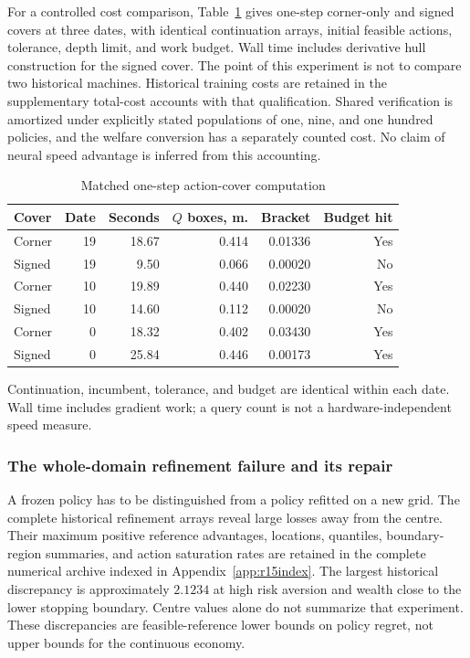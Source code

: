 For a controlled cost comparison, Table~\ref{tab:r9matched} gives one-step corner-only and signed covers at three dates, with identical continuation arrays, initial feasible actions, tolerance, depth limit, and work budget. Wall time includes derivative hull construction for the signed cover. The point of this experiment is not to compare two historical machines. Historical training costs are retained in the supplementary total-cost accounts with that qualification. Shared verification is amortized under explicitly stated populations of one, nine, and one hundred policies, and the welfare conversion has a separately counted cost. No claim of neural speed advantage is inferred from this accounting.

\begin{table}[htbp]
\centering\small\setlength{\tabcolsep}{4pt}
\caption{Matched one-step action-cover computation}\label{tab:r9matched}
\begin{tabular}{lrrrrr}
\toprule
Cover & Date & Seconds & $Q$ boxes, m. & Bracket & Budget hit \\
\midrule
Corner & 19 & 18.67 & 0.414 & 0.01336 & Yes \\
Signed & 19 & 9.50 & 0.066 & 0.00020 & No \\
Corner & 10 & 19.89 & 0.440 & 0.02230 & Yes \\
Signed & 10 & 14.60 & 0.112 & 0.00020 & No \\
Corner & 0 & 18.32 & 0.402 & 0.03430 & Yes \\
Signed & 0 & 25.84 & 0.446 & 0.00173 & Yes \\
\bottomrule
\end{tabular}
\par\vspace{3pt}\begin{minipage}{0.97\linewidth}\footnotesize Continuation, incumbent, tolerance, and budget are identical within each date. Wall time includes gradient work; a query count is not a hardware-independent speed measure.\end{minipage}
\end{table}



\subsubsection{The whole-domain refinement failure and its repair}
A frozen policy has to be distinguished from a policy refitted on a new grid. The complete historical refinement arrays reveal large losses away from the centre. Their maximum positive reference advantages, locations, quantiles, boundary-region summaries, and action saturation rates are retained in the complete numerical archive indexed in Appendix~\ref{app:r15index}. The largest historical discrepancy is approximately $2.1234$ at high risk aversion and wealth close to the lower stopping boundary. Centre values alone do not summarize that experiment. These discrepancies are feasible-reference lower bounds on policy regret, not upper bounds for the continuous economy.

